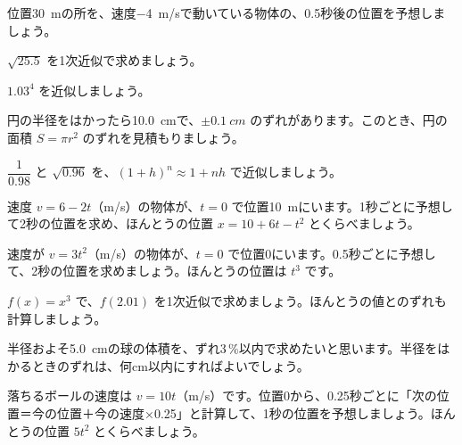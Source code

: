\bkendproblems
{}

\bkproblem 位置\qty{30}{m}の所を、速度\qty{-4}{m/s}で動いている物体の、0.5秒後の位置を予想しましょう。

\bkproblem $\sqrt{25.5}$ を1次近似で求めましょう。

\bkproblem $1.03^4$ を近似しましょう。

\bkproblem 円の半径をはかったら\qty{10.0}{cm}で、$\pm\qty{0.1}{cm}$ のずれがあります。このとき、円の面積 $S=\pi r^2$ のずれを見積もりましょう。

\bkproblem $\dfrac{1}{0.98}$ と $\sqrt{0.96}$ を、$(1+h)^n\approx1+nh$ で近似しましょう。

\bkproblem 速度 $v=6-2t$（m/s）の物体が、$t=0$ で位置\qty{10}{m}にいます。1秒ごとに予想して2秒の位置を求め、ほんとうの位置 $x=10+6t-t^2$ とくらべましょう。


\bkproblem 速度が $v=3t^2$（m/s）の物体が、$t=0$ で位置0にいます。0.5秒ごとに予想して、2秒の位置を求めましょう。ほんとうの位置は $t^3$ です。

\bkproblem $f(x)=x^3$ で、$f(2.01)$ を1次近似で求めましょう。ほんとうの値とのずれも計算しましょう。

\bkproblem 半径およそ\qty{5.0}{cm}の球の体積を、ずれ3\,\%以内で求めたいと思います。半径をはかるときのずれは、何cm以内にすればよいでしょう。

\bkproblem 落ちるボールの速度は $v=10t$（m/s）です。位置0から、0.25秒ごとに「次の位置＝今の位置＋今の速度×0.25」と計算して、1秒の位置を予想しましょう。ほんとうの位置 $5t^2$ とくらべましょう。

